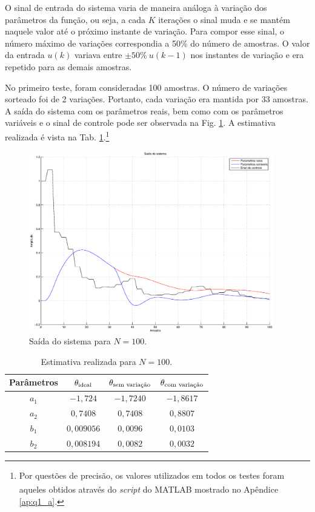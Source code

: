 O sinal de entrada do sistema varia de maneira análoga à variação dos parâmetros
da função, ou seja, a cada $K$ iterações o sinal muda e se mantém naquele valor
até o próximo instante de variação. Para compor esse sinal, o número máximo de
variações correspondia a 50\% do número de amostras. O valor da entrada $u(k)$
variava entre $\pm 50\%\ u(k-1)$ nos instantes de variação e era repetido para as
demais amostras.

No primeiro teste, foram consideradas 100 amostras. O número de variações
sorteado foi de 2 variações. Portanto, cada variação era mantida por 33
amostras. A saída do sistema com os parâmetros reais, bem como com os parâmetros
variáveis e o sinal de controle pode ser observada na Fig.
\ref{fig:saida_sist_100}. A estimativa realizada é vista na Tab.
\ref{tab:estimativa_100}.\footnote{Por questões de precisão, os valores
utilizados em todos os testes foram aqueles obtidos através do {\it script} do
MATLAB\textsuperscript{\textregistered} mostrado no Apêndice \ref{ap:q1_a}.}

\begin{figure}[htb]
\centering
    \includegraphics[width=0.95\textwidth]{imgs/questao2/saida_100}
    \caption{Saída do sistema para $N = 100$.}
    \label{fig:saida_sist_100}
\end{figure}

\begin{table}
\centering
    \caption{Estimativa realizada para $N = 100$.}
    \label{tab:estimativa_100}
    \vspace{0.25cm}
    \begin{tabular}{|c|c|c|c|}
        \hline
        Parâmetros & 
        $\mathbf{\theta}_{\text{ideal}}$&
        $\mathbf{\theta}_{\text{sem variação}}$&
        $\mathbf{\theta}_{\text{com variação}}$\\
        \hline
        \hline
        $a_1$ & $-1,724$   & $-1,7240$ & $-1,8617$ \\
        \hline
        $a_2$ & $0,7408$   & $0,7408$  & $0,8807$ \\
        \hline
        $b_1$ & $0,009056$ & $0,0096$  & $0,0103$ \\
        \hline
        $b_2$ & $0,008194$ & $0,0082$  & $0,0032$ \\
        \hline
    \end{tabular}
\end{table}

